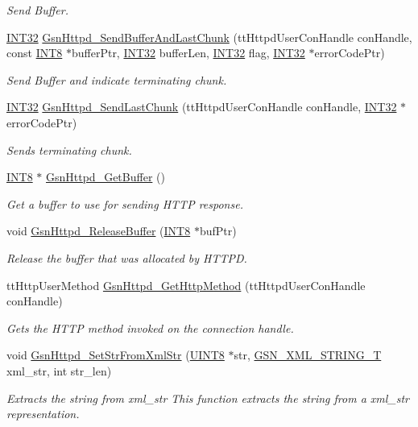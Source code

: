 \begin{DoxyCompactItemize}
\begin{DoxyCompactList}\small\item\em Send Buffer. \end{DoxyCompactList}\item 
\hyperlink{a00660_ga63021d67d54286c2163bcdb43a6f2569}{INT32} \hyperlink{a00666_ga9e05db18fe9e554159a3fe594492687d}{GsnHttpd\_\-SendBufferAndLastChunk} (ttHttpdUserConHandle conHandle, const \hyperlink{a00660_ga307b8734c020247f6bac4fcde0dcfbb9}{INT8} $\ast$bufferPtr, \hyperlink{a00660_ga63021d67d54286c2163bcdb43a6f2569}{INT32} bufferLen, \hyperlink{a00660_ga63021d67d54286c2163bcdb43a6f2569}{INT32} flag, \hyperlink{a00660_ga63021d67d54286c2163bcdb43a6f2569}{INT32} $\ast$errorCodePtr)
\begin{DoxyCompactList}\small\item\em Send Buffer and indicate terminating chunk. \end{DoxyCompactList}\item 
\hyperlink{a00660_ga63021d67d54286c2163bcdb43a6f2569}{INT32} \hyperlink{a00666_ga04f2afbebcac5ab376d70b735803d69d}{GsnHttpd\_\-SendLastChunk} (ttHttpdUserConHandle conHandle, \hyperlink{a00660_ga63021d67d54286c2163bcdb43a6f2569}{INT32} $\ast$errorCodePtr)
\begin{DoxyCompactList}\small\item\em Sends terminating chunk. \end{DoxyCompactList}\item 
\hyperlink{a00660_ga307b8734c020247f6bac4fcde0dcfbb9}{INT8} $\ast$ \hyperlink{a00666_ga38a6f342aa4579945c64f4809c5feb20}{GsnHttpd\_\-GetBuffer} ()
\begin{DoxyCompactList}\small\item\em Get a buffer to use for sending HTTP response. \end{DoxyCompactList}\item 
void \hyperlink{a00666_ga98b1c525385ddbcbaac8ec8ba4d32ea4}{GsnHttpd\_\-ReleaseBuffer} (\hyperlink{a00660_ga307b8734c020247f6bac4fcde0dcfbb9}{INT8} $\ast$bufPtr)
\begin{DoxyCompactList}\small\item\em Release the buffer that was allocated by HTTPD. \end{DoxyCompactList}\item 
ttHttpUserMethod \hyperlink{a00666_gaecd42418ea97610f5b55c35c5419cd13}{GsnHttpd\_\-GetHttpMethod} (ttHttpdUserConHandle conHandle)
\begin{DoxyCompactList}\small\item\em Gets the HTTP method invoked on the connection handle. \end{DoxyCompactList}\item 
void \hyperlink{a00666_ga1d8828de7be384020ba6bbb1ea26a47c}{GsnHttpd\_\-SetStrFromXmlStr} (\hyperlink{a00660_gab27e9918b538ce9d8ca692479b375b6a}{UINT8} $\ast$str, \hyperlink{a00436}{GSN\_\-XML\_\-STRING\_\-T} xml\_\-str, int str\_\-len)
\begin{DoxyCompactList}\small\item\em Extracts the string from xml\_\-str This function extracts the string from a xml\_\-str representation. \end{DoxyCompactList}\end{DoxyCompactItemize}

